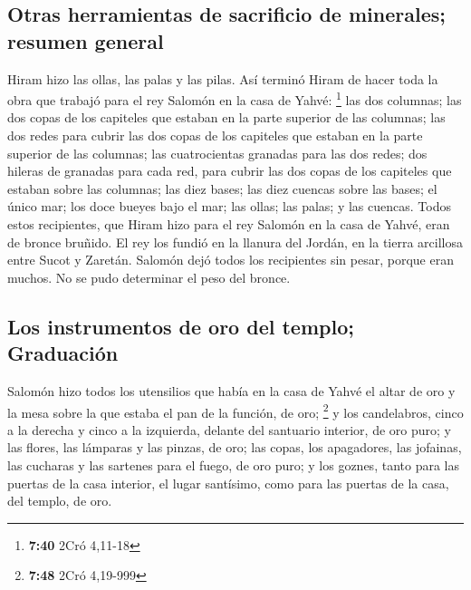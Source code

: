 \hypertarget{otras-herramientas-de-sacrificio-de-minerales-resumen-general}{%
\subsection{Otras herramientas de sacrificio de minerales; resumen
general}\label{otras-herramientas-de-sacrificio-de-minerales-resumen-general}}

 Hiram hizo las ollas, las palas y las pilas. Así terminó
Hiram de hacer toda la obra que trabajó para el rey Salomón en la casa
de Yahvé: \footnote{\textbf{7:40} 2Cró 4,11-18}  las dos
columnas; las dos copas de los capiteles que estaban en la parte
superior de las columnas; las dos redes para cubrir las dos copas de los
capiteles que estaban en la parte superior de las columnas;
 las cuatrocientas granadas para las dos redes; dos
hileras de granadas para cada red, para cubrir las dos copas de los
capiteles que estaban sobre las columnas;  las diez
bases; las diez cuencas sobre las bases;  el único mar;
los doce bueyes bajo el mar;  las ollas; las palas; y las
cuencas. Todos estos recipientes, que Hiram hizo para el rey Salomón en
la casa de Yahvé, eran de bronce bruñido.  El rey los
fundió en la llanura del Jordán, en la tierra arcillosa entre Sucot y
Zaretán.  Salomón dejó todos los recipientes sin pesar,
porque eran muchos. No se pudo determinar el peso del bronce.

\hypertarget{los-instrumentos-de-oro-del-templo-graduaciuxf3n}{%
\subsection{Los instrumentos de oro del templo;
Graduación}\label{los-instrumentos-de-oro-del-templo-graduaciuxf3n}}

 Salomón hizo todos los utensilios que había en la casa
de Yahvé el altar de oro y la mesa sobre la que estaba el pan de la
función, de oro; \footnote{\textbf{7:48} 2Cró 4,19-999} 
y los candelabros, cinco a la derecha y cinco a la izquierda, delante
del santuario interior, de oro puro; y las flores, las lámparas y las
pinzas, de oro;  las copas, los apagadores, las jofainas,
las cucharas y las sartenes para el fuego, de oro puro; y los goznes,
tanto para las puertas de la casa interior, el lugar santísimo, como
para las puertas de la casa, del templo, de oro.

